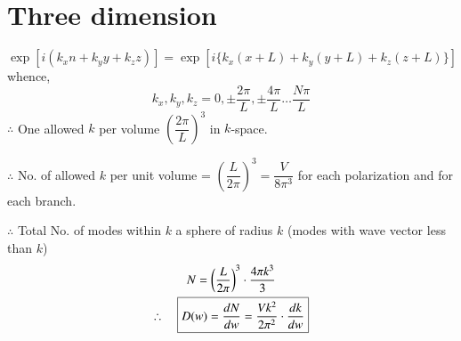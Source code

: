 \section{Three dimension}
$$
\exp [i(k_{x}n+k_{y}y+k_{z}z)]=\exp [i\{k_{x}(x+L)+k_{y}(y+L)+k_{z}(z+L)\}]
$$
whence,
$$
k_{x},k_{y},k_{z}=0, \pm \dfrac{2\pi}{L}, \pm \dfrac{4\pi}{L}\ldots \dfrac{N\pi}{L}
$$
$\therefore$ One allowed $k$ per volume $\left(\dfrac{2\pi}{L}\right)^{3}$ in $k$-space.

$\therefore$ No. of allowed $k$ per unit volume = $\left(\dfrac{L}{2\pi}\right)^{3}=\dfrac{V}{8\pi^{3}}$ for each polarization and for each branch.

$\therefore$ Total No. of modes within $k$ a sphere of radius $k$ (modes with wave vector less than $k$)
\begin{gather*}
N=\left(\dfrac{L}{2\pi}\right)^{3}\cdot \dfrac{4\pi k^{3}}{3}\\
\therefore\quad \fbox{$D(w)=\dfrac{dN}{dw}=\dfrac{Vk^{2}}{2\pi^{2}}\cdot \dfrac{dk}{dw}$}
\end{gather*}

